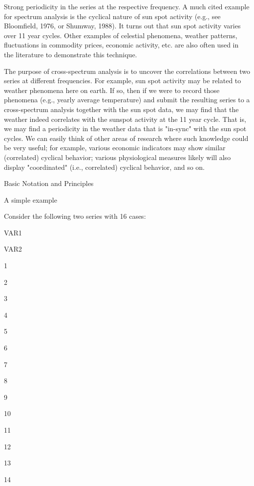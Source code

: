 Strong periodicity in the series at the respective frequency. A much cited example for spectrum analysis is the cyclical nature of sun spot activity (e.g., see Bloomfield, 1976, or Shumway, 1988). It turns out that sun spot activity varies over 11 year cycles. Other examples of celestial phenomena, weather patterns, fluctuations in commodity prices, economic activity, etc. are also often used in the literature to demonstrate this technique.

The purpose of cross-spectrum analysis is to uncover the correlations between two series at different frequencies. For example, sun spot activity may be related to weather phenomena here on earth. If so, then if we were to record those phenomena (e.g., yearly average temperature) and submit the resulting series to a cross-spectrum analysis together with the sun spot data, we may find that the weather indeed correlates with the sunspot activity at the 11 year cycle. That is, we may find a periodicity in the weather data that is "in-sync" with the sun spot cycles. We can easily think of other areas of research where such knowledge could be very useful; for example, various economic indicators may show similar (correlated) cyclical behavior; various physiological measures likely will also display "coordinated" (i.e., correlated) cyclical behavior, and so on.

Basic Notation and Principles

A simple example

Consider the following two series with 16 cases:










 
 

VAR1
 

VAR2
 



1

2

3

4

5

6

7

8

9

10

11

12

13

14

